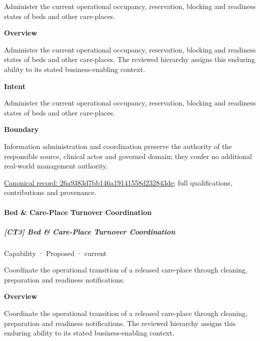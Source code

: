 Administer the current operational occupancy, reservation, blocking and readiness states of beds and other care-places.



\textbf{Overview}



Administer the current operational occupancy, reservation, blocking and readiness states of beds and other care-places. The reviewed hierarchy assigns this enduring ability to its stated business-enabling context.



\textbf{Intent}



Administer the current operational occupancy, reservation, blocking and readiness states of beds and other care-places.



\textbf{Boundary}



Information administration and coordination preserve the authority of the responsible source, clinical actor and governed domain; they confer no additional real-world management authority.


{\footnotesize \href{../../../../continuum/strategy/capability/26a9383d7bb146a19141558d232843de.md}{Canonical record: 26a9383d7bb146a19141558d232843de}; full qualifications, contributions and provenance.}\par
\paragraph{Bed \& Care-Place Turnover Coordination}

\subparagraph{[CT3] Bed \& Care-Place Turnover Coordination}

\label{element:3c9464f9eae1415d8fa041bd1f3da4f2}
{\small Capability · Proposed · current}\par

Coordinate the operational transition of a released care-place through cleaning, preparation and readiness notifications.



\textbf{Overview}



Coordinate the operational transition of a released care-place through cleaning, preparation and readiness notifications. The reviewed hierarchy assigns this enduring ability to its stated business-enabling context.



